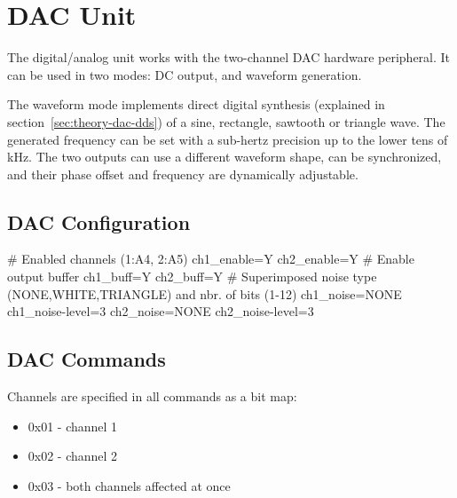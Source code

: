 \section{DAC Unit}

The digital/analog unit works with the two-channel \gls{DAC} hardware peripheral. It can be used in two modes: \gls{DC} output, and waveform generation.

The waveform mode implements direct digital synthesis (explained in section~\ref{sec:theory-dac-dds}) of a sine, rectangle, sawtooth or triangle wave. The generated frequency can be set with a sub-hertz precision up to the lower tens of kHz. The two outputs can use a different waveform shape, can be synchronized, and their phase offset and frequency are dynamically adjustable.

\subsection{DAC Configuration}

\begin{inicode}
# Enabled channels (1:A4, 2:A5)
ch1_enable=Y
ch2_enable=Y
# Enable output buffer
ch1_buff=Y
ch2_buff=Y
# Superimposed noise type (NONE,WHITE,TRIANGLE) and nbr. of bits (1-12)
ch1_noise=NONE
ch1_noise-level=3
ch2_noise=NONE
ch2_noise-level=3
\end{inicode}

\subsection{DAC Commands}

Channels are specified in all commands as a bit map:

\begin{itemize}[nosep]
	\item 0x01 - channel 1
	\item 0x02 - channel 2
	\item 0x03 - both channels affected at once
\end{itemize}

